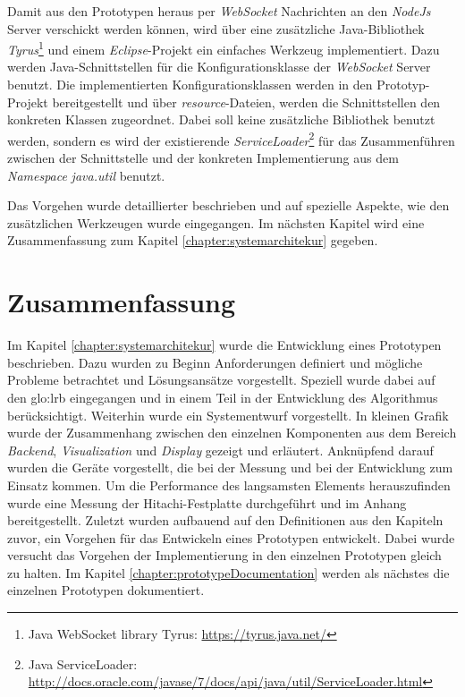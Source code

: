 Damit aus den Prototypen heraus per \textit{WebSocket} Nachrichten an den \textit{NodeJs} Server verschickt werden können, wird über eine zusätzliche Java-Bibliothek \textit{Tyrus}\footnote{Java WebSocket library Tyrus: \url{https://tyrus.java.net/}} und einem \textit{Eclipse}-Projekt ein einfaches Werkzeug implementiert. Dazu werden Java-Schnittstellen für die Konfigurationsklasse der \textit{WebSocket} Server benutzt. Die implementierten Konfigurationsklassen werden in den Prototyp-Projekt bereitgestellt und über \textit{resource}-Dateien, werden die Schnittstellen den konkreten Klassen zugeordnet. Dabei soll keine zusätzliche Bibliothek benutzt werden, sondern es wird der existierende \textit{ServiceLoader}\footnote{Java ServiceLoader: \url{http://docs.oracle.com/javase/7/docs/api/java/util/ServiceLoader.html}} für das Zusammenführen zwischen der Schnittstelle und der konkreten Implementierung aus dem \textit{Namespace} \textit{java.util} benutzt.

Das Vorgehen wurde detaillierter beschrieben und auf spezielle Aspekte, wie den zusätzlichen Werkzeugen wurde eingegangen. Im nächsten Kapitel wird eine Zusammenfassung zum Kapitel \ref{chapter:systemarchitekur} gegeben.


\section{Zusammenfassung}

Im Kapitel \ref{chapter:systemarchitekur} wurde die Entwicklung eines Prototypen beschrieben. Dazu wurden zu Beginn Anforderungen definiert und mögliche Probleme betrachtet und Lösungsansätze vorgestellt. Speziell wurde dabei auf den \gls{glo:lrb} eingegangen und in einem Teil in der Entwicklung des Algorithmus berücksichtigt. Weiterhin wurde ein Systementwurf vorgestellt. In kleinen Grafik wurde der Zusammenhang zwischen den einzelnen Komponenten aus dem Bereich \textit{Backend}, \textit{Visualization} und \textit{Display} gezeigt und erläutert. Anknüpfend darauf wurden die Geräte vorgestellt, die bei der Messung und bei der Entwicklung zum Einsatz kommen. Um die Performance des langsamsten Elements herauszufinden wurde eine Messung der Hitachi-Festplatte durchgeführt und im Anhang bereitgestellt. Zuletzt wurden aufbauend auf den Definitionen aus den Kapiteln zuvor, ein Vorgehen für das Entwickeln eines Prototypen entwickelt. Dabei wurde versucht das Vorgehen der Implementierung in den einzelnen Prototypen gleich zu halten. Im Kapitel \ref{chapter:prototypeDocumentation} werden als nächstes die einzelnen Prototypen dokumentiert.